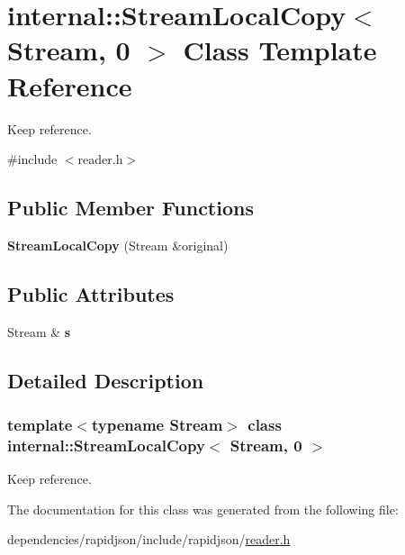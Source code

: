 \hypertarget{classinternal_1_1_stream_local_copy_3_01_stream_00_010_01_4}{}\section{internal\+:\+:Stream\+Local\+Copy$<$ Stream, 0 $>$ Class Template Reference}
\label{classinternal_1_1_stream_local_copy_3_01_stream_00_010_01_4}


Keep reference.  




{\ttfamily \#include $<$reader.\+h$>$}

\subsection*{Public Member Functions}
\begin{DoxyCompactItemize}
\item 
\mbox{\label{classinternal_1_1_stream_local_copy_3_01_stream_00_010_01_4_ac684a7be07d79d6ddd274dc1150f4b79}} 
{\bfseries Stream\+Local\+Copy} (Stream \&original)
\end{DoxyCompactItemize}
\subsection*{Public Attributes}
\begin{DoxyCompactItemize}
\item 
\mbox{\label{classinternal_1_1_stream_local_copy_3_01_stream_00_010_01_4_ad31147888384f4bd51eabc2d7acdc4b6}} 
Stream \& {\bfseries s}
\end{DoxyCompactItemize}


\subsection{Detailed Description}
\subsubsection*{template$<$typename Stream$>$\newline
class internal\+::\+Stream\+Local\+Copy$<$ Stream, 0 $>$}

Keep reference. 

The documentation for this class was generated from the following file\+:\begin{DoxyCompactItemize}
\item 
dependencies/rapidjson/include/rapidjson/\hyperlink{reader_8h}{reader.\+h}\end{DoxyCompactItemize}
